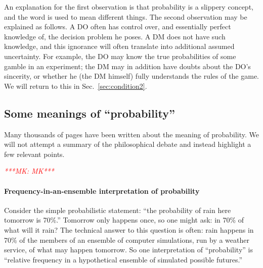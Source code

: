 \documentclass[a4paper, 12pt]{article}
\newcommand{\seclabel}[1]{\label{sec:#1}}
\newcommand{\secref}[1]{Sec.~\ref{sec:#1}}
\newcommand{\ie}{{\it i.e.}\ }
\newcommand{\eg}{{\it e.g.}\ }
\newcommand{\MK}[1]{\textcolor{red}{\textit{***MK: #1 MK***}}}
\begin{document}
An explanation for the first observation is that probability is a slippery concept, and the word is used to mean different things. 
The second observation may be explained as follows. A DO often has control over, and essentially perfect knowledge of, the decision problem he poses. A DM does not have such knowledge, and this ignorance will often translate into additional assumed uncertainty. For example, the DO may know the true probabilities of some gamble in an experiment; the DM may in addition have doubts about the DO's sincerity, or whether he (the DM himself) fully understands the rules of the game. We will return to this in \secref{condition2}.

\subsection{Some meanings of ``probability'' \seclabel{tricky}}

Many thousands of pages have been written about the meaning of probability. We will not attempt a summary of the philosophical debate and instead highlight a few relevant points.

\MK{}
\paragraph{Frequency-in-an-ensemble interpretation of probability}
Consider the simple pro\-babilistic statement: ``the probability of rain here tomorrow is 70\%.'' Tomorrow only happens once, so one might ask: in 70\% of what will it rain? The technical answer to this question is often: rain happens in 70\% of the members of an ensemble of computer simulations, run by a weather service, of what may happen tomorrow. So one interpretation of ``probability'' is ``relative frequency in a hypothetical ensemble of simulated possible futures.'' 
\end{document}
